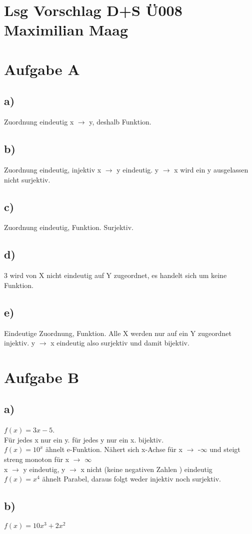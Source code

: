 \documentclass{article}
\begin{document}
	\section*{Lsg Vorschlag D+S Ü008 Maximilian Maag}
	\section*{Aufgabe A}
	\subsection*{a)}
	Zuordnung eindeutig x $\to$ y, deshalb Funktion.   
	\subsection*{b)}
	Zuordnung eindeutig, injektiv x $\to$ y eindeutig. y $\to$ x wird ein y ausgelassen nicht surjektiv.
	\subsection*{c)}
	Zuordnung eindeutig, Funktion. Surjektiv.
	\subsection*{d)}
	3 wird von X nicht eindeutig auf Y zugeordnet, es handelt sich um keine Funktion.
	\subsection*{e)}
	Eindeutige Zuordnung, Funktion. Alle X werden nur auf ein Y zugeordnet injektiv. y $\to$ x eindeutig also surjektiv und damit bijektiv.
	\section*{Aufgabe B}
	\subsection*{a)}
	$f(x) = 3x - 5$. \\
	Für jedes x nur ein y. für jedes y nur ein x. bijektiv. \\
	$f(x) = 10^x$ ähnelt e-Funktion. Nähert sich x-Achse für x $\to$ -$\infty$ und steigt streng monoton für x $\to$ $\infty$ \\
	x $\to$ y eindeutig, y $\to$ x  nicht (keine negativen Zahlen ) eindeutig \\
	$f(x) = x^4$ ähnelt Parabel, daraus folgt weder injektiv noch surjektiv.
	\subsection*{b)}
	$f(x) = 10x^3 + 2x^2$
\end{document}
